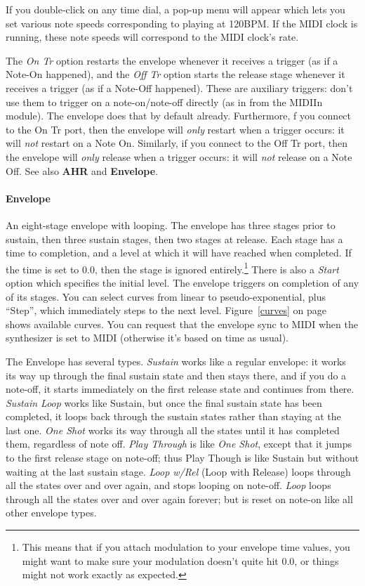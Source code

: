 \documentclass{article}
\begin{document}
If you double-click on any time dial, a pop-up menu will appear which lets you set various note speeds corresponding to playing at 120BPM.  If the MIDI clock is running, these note speeds will correspond to the MIDI clock's rate.

The {\it On Tr} option restarts the envelope whenever it receives a trigger (as if a Note-On happened), and the {\it Off Tr} option starts the release stage whenever it receives a trigger (as if a Note-Off happened).  These are auxiliary triggers: don't use them to trigger on a note-on/note-off directly (as in from the MIDIIn module).  The envelope does that by default already.  Furthermore, f you connect to the On Tr port, then the envelope will {\it only} restart when a trigger occurs: it will {\it not} restart on a Note On.  Similarly, if you connect to the Off Tr port, then the envelope will {\it only} release when a trigger occurs: it will {\it not} release on a Note Off.  See also {\bf AHR} and {\bf Envelope}.
 
\paragraph{Envelope}  An eight-stage envelope with looping.  The envelope has three stages prior to sustain, then three sustain stages, then two stages at release.  Each stage has a time to completion, and a level at which it will have reached when completed.  If the time is set to 0.0, then the stage is ignored entirely.\footnote{This means that if you attach modulation to your envelope time values, you might want to make sure your modulation doesn't quite hit 0.0, or things might not work exactly as expected.}  There is also a {\it Start} option which specifies the initial level.  The envelope triggers on completion of any of its stages.  You can select curves from linear to pseudo-exponential, plus ``Step'', which immediately steps to the next level.  Figure~\ref{curves} on page~\pageref{curves} shows available curves.  You can request that the envelope sync to MIDI when the synthesizer is set to MIDI (otherwise it's based on time as usual). 

The Envelope has several types.  {\it Sustain} works like a regular envelope: it works its way up through the final sustain state and then stays there, and if you do a note-off, it starts immediately on the first release state and continues from there.  {\it Sustain Loop} works like Sustain, but once the final sustain state has been completed, it loops back through the sustain states rather than staying at the last one.  {\it One Shot} works its way through all the states until  it has completed them, regardless of note off.  {\it Play Through} is like {\it One Shot}, except that it jumps to the first release stage on note-off; thus Play Though is like Sustain but without waiting at the last sustain stage.  {\it Loop w/Rel} (Loop with Release) loops through all the states over and over again, and stops looping on note-off.  {\it Loop} loops through all the states over and over again forever; but is reset on note-on like all other envelope types.
   
\end{document}
